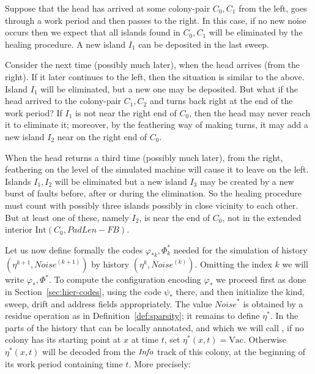 \documentclass[11pt]{memoir}
\theoremstyle{definition} %
\newcommand{\fld}[1]{\ensuremath{\textit{#1\/}}}
\def\B{B}
\newcommand{\F}{F}
\newcommand{\Int}{\mathrm{Int}} %
\newcommand{\Noise}{\mathit{Noise}}
\newcommand{\PadLen}{\mathit{PadLen}} %
\newcommand{\Info}{\fld{Info}}
\newcommand{\Vacant}{\mathrm{Vac}}
\begin{document}
\begin{example}\label{xmp:3-islands}
  Suppose that the head has arrived at some colony-pair \( C_{0},C_{1} \) from the left,
goes through a work period and then passes to the right.
In this case, if no new noise occurs then we expect that
all islands found in \( C_{0},C_{1} \) will be eliminated by the healing procedure.
A new island \( I_{1} \) can be deposited in the last sweep.

Consider the next time (possibly much later), when the head arrives (from the right).
If it later continues to the left, then the situation is similar to the above.
Island \( I_{1} \) will be eliminated, but a new one may be deposited.
But what if the head arrived to the colony-pair \( C_{1},C_{2} \) and
turns back right at the end of the work period?
If \( I_{1} \) is not near the right end of \( C_{0} \), then
the head may never reach it to eliminate it; moreover, by the
feathering way of making turns,
it may add a new island \( I_{2} \) near on the right end of \( C_{0} \).

When the head returns a third time (possibly much later), 
from the right, feathering on the level of the simulated machine will
cause it to leave on the left.
Islands \( I_{1},I_{2} \) will be eliminated but a new island
\( I_{3} \) may be created by a new burst of faults before, after or during the elimination.
So the healing procedure must count with possibly three islands
possibly in close vicinity to each other.
But at least one of these, namely \( I_{2} \), is near the end of \( C_{0} \), not in
the extended interior \( \Int(C_{0},\PadLen-\F\B) \).
\end{example}

Let us now define formally the codes \( \varphi_{*k},\Phi_{k}^{*} \) needed
for the simulation of history \( (\eta^{k+1},\Noise^{(k+1)}) \) by history \( (\eta^{k},\Noise^{(k)}) \).
Omitting the index \( k \) we will write \( \varphi_{*},\Phi^{*} \).
To compute the configuration encoding \( \varphi_{*} \) we proceed first as
done in Section~\ref{sec:hier-codes}, using the code \( \psi_{*} \) there,
and then initialize the kind, sweep, drift and address fields appropriately.
The value \( \Noise^{*} \) is obtained by a residue operation
as in Definition~\ref{def:sparsity}; it remains to define \( \eta^{*} \).
In the parts of the history that can be locally annotated, and which we will call ,
if no colony has its starting point at \( x \) at time \( t \), set \( \eta^{*}(x,t)=\Vacant \).
Otherwise \( \eta^{*}(x,t) \) will be decoded from
the \( \Info \) track of this colony, at the beginning of its work period 
containing time \( t \).
More precisely:
\end{document}
